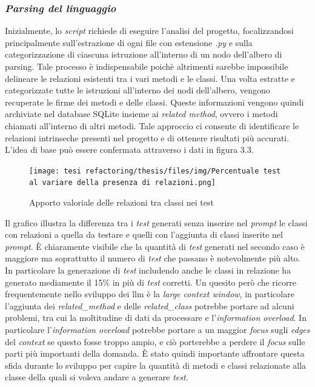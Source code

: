     \subsubsection{\textit{Parsing del linguaggio}}
    Inizialmente, lo \textit{script} richiede di eseguire l'analisi del progetto, focalizzandosi principalmente sull'estrazione di ogni file con estensione \textit{.py}
    e sulla categorizzazione di ciascuna istruzione all'interno di un nodo dell'albero di parsing. Tale processo è indispensabile poichè altrimenti sarebbe 
    impossibile delineare le relazioni esistenti tra i vari metodi e le classi.
    Una volta estratte e categorizzate tutte le istruzioni all'interno dei nodi dell'albero, vengono recuperate le firme dei metodi e delle classi. 
    Queste informazioni vengono quindi archiviate nel database SQLite insieme ai \textit{related method}, ovvero i metodi chiamati all'interno di altri metodi. 
    Tale approccio ci consente di identificare le relazioni intrinseche presenti nel progetto e di ottenere risultati più accurati.
    L'idea di base può essere confermata attraverso i dati in figura 3.3.
    \begin{figure}[!h]
        \centering        
        \texttt{[image: tesi refactoring/thesis/files/img/Percentuale test al variare della presenza di relazioni.png]}
        \caption{Apporto valoriale delle relazioni tra classi nei test}
    \end{figure}
     Il grafico illustra la differenza tra i \textit{test} generati senza inserire nel \textit{prompt} le classi con relazioni a quella da testare e quelli 
    con l'aggiunta di classi inserite nel \textit{prompt}. È chiaramente visibile che la quantità di \textit{test} generati nel secondo caso è maggiore ma soprattutto il numero di \textit{test} che passano è notevolmente più alto.
    In particolare la generazione di \textit{test} includendo anche le classi in relazione ha generato mediamente il 15\% in più di \textit{test} corretti.
    Un quesito però che ricorre frequentemente nello sviluppo dei \gls{llm} è la \textit{large context window}, in particolare l'aggiunta dei \textit{related\_method} e delle \textit{related\_class} potrebbe portare ad alcuni problemi, tra cui la moltitudine di dati da processare e l'\textit{information overload}.
    In particolare l'\textit{information overload} potrebbe portare a un maggior \textit{focus} sugli \textit{edges} del \textit{context} se questo fosse troppo ampio, e ciò porterebbe a perdere il \textit{focus} sulle parti più importanti della domanda. È stato quindi importante affrontare questa sfida durante lo sviluppo per capire la quantità di metodi e classi relazionate alla classe della quali si voleva andare a generare \textit{test}.
